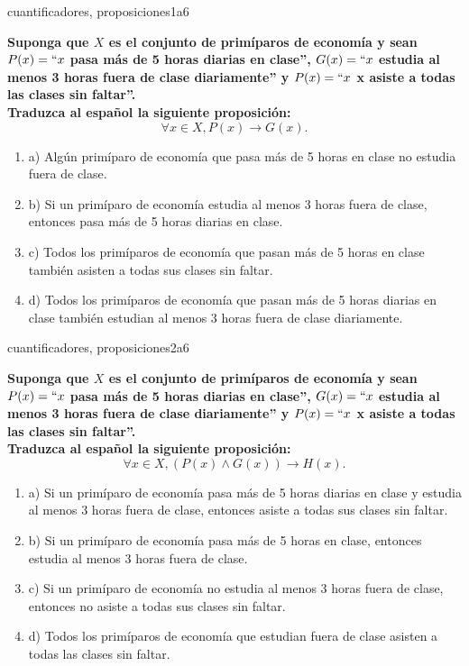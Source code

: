 \documentclass{article}
\begin{document}
\begin{question}{41}{cuantificadores, proposiciones}{1}{a}{6}{
\textbf{Suponga que $X$ es el conjunto de primíparos de economía y sean $P(x)=``x$ pasa más de 5 horas diarias en clase'', $G(x)=``x$ estudia al menos 3 horas fuera de clase diariamente'' y $P(x)=``x$ x asiste a todas las clases sin faltar''.}\\

\textbf{Traduzca al español la siguiente proposición:}
\[
\forall x \in X, P(x) \rightarrow G(x).
\]

\begin{enumerate}
\item a) Algún primíparo de economía que pasa más de 5 horas en clase no estudia fuera de clase.
\item b) Si un primíparo de economía estudia al menos 3 horas fuera de clase, entonces pasa más de 5 horas diarias en clase.
\item c) Todos los primíparos de economía que pasan más de 5 horas en clase también asisten a todas sus clases sin faltar.
\item d) Todos los primíparos de economía que pasan más de 5 horas diarias en clase también estudian al menos 3 horas fuera de clase diariamente.
\end{enumerate}
}
\end{question}

\begin{question}{42}{cuantificadores, proposiciones}{2}{a}{6}{
\textbf{Suponga que $X$ es el conjunto de primíparos de economía y sean $P(x)=``x$ pasa más de 5 horas diarias en clase'', $G(x)=``x$ estudia al menos 3 horas fuera de clase diariamente'' y $P(x)=``x$ x asiste a todas las clases sin faltar''.}\\

\textbf{Traduzca al español la siguiente proposición:}
\[
\forall x \in X, (P(x) \land G(x)) \rightarrow H(x).
\]

\begin{enumerate}
\item a) Si un primíparo de economía pasa más de 5 horas diarias en clase y estudia al menos 3 horas fuera de clase, entonces asiste a todas sus clases sin faltar.
\item b) Si un primíparo de economía pasa más de 5 horas en clase, entonces estudia al menos 3 horas fuera de clase.
\item c) Si un primíparo de economía no estudia al menos 3 horas fuera de clase, entonces no asiste a todas sus clases sin faltar.
\item d) Todos los primíparos de economía que estudian fuera de clase asisten a todas las clases sin faltar.
\end{enumerate}
}
\end{question}
\end{document}
